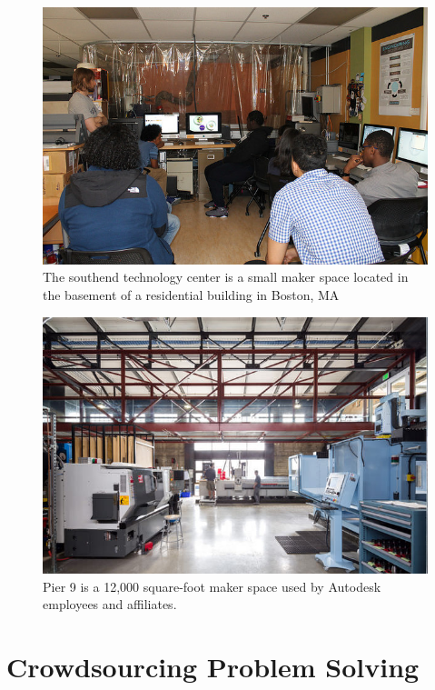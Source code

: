    \begin{figure}[thpb]
      \centering
      \includegraphics[width=\textwidth]{figures/setc-fablab.jpg}
      \caption{The southend technology center is a small maker space located in the basement of a residential building in Boston, MA \cite{setc}}
      \label{fig_setc_class}
   \end{figure}

   \begin{figure}[thpb]
      \centering
      \includegraphics[width=\textwidth]{figures/pier9.jpg}
      \caption{Pier 9 is a 12,000 square-foot maker space used by Autodesk employees and affiliates.\cite{pier9}}
      \label{fig_pier9}
   \end{figure}

\section{Crowdsourcing Problem Solving}

